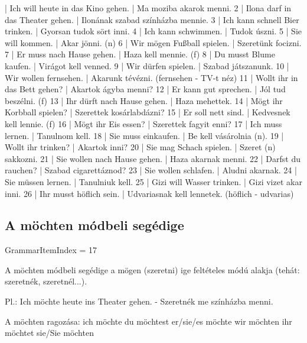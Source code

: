 \documentclass{article}
\newenvironment{desc}{\verbatim}{\endverbatim}
\newenvironment{exmp}{\verbatim}{\endverbatim}
\begin{document}
\begin{exmp}
1 | Ich will heute in das Kino gehen. | Ma moziba akarok menni.
2 | Ilona darf in das Theater gehen. | Ilonának szabad színházba mennie.
3 | Ich kann schnell Bier trinken. | Gyorsan tudok sört inni.
4 | Ich kann schwimmen. | Tudok úszni.
5 | Sie will kommen. | Akar jönni. (n)
6 | Wir mögen Fußball spielen. | Szeretünk focizni.
7 | Er muss nach Hause gehen. | Haza kell mennie. (f)
8 | Du musst Blume kaufen. | Virágot kell venned.
9 | Wir dürfen spielen. | Szabad játszanunk.
10 | Wir wollen fernsehen. | Akarunk tévézni. (fernsehen - TV-t néz)
11 | Wollt ihr in das Bett gehen? | Akartok ágyba menni?
12 | Er kann gut sprechen. | Jól tud beszélni. (f)
13 | Ihr dürft nach Hause gehen. | Haza mehettek.
14 | Mögt ihr Korbball spielen? | Szerettek kosárlabdázni?
15 | Er soll nett sind. | Kedvesnek kell lennie. (f)
16 | Mögt ihr Eis essen? | Szerettek fagyit enni?
17 | Ich muss lernen. | Tanulnom kell.
18 | Sie muss einkaufen. | Be kell vásárolnia (n).
19 | Wollt ihr trinken? | Akartok inni?
20 | Sie mag Schach spielen. | Szeret (n) sakkozni.
21 | Sie wollen nach Hause gehen. | Haza akarnak menni.
22 | Darfst du rauchen? | Szabad cigarettáznod?
23 | Sie wollen schlafen. | Aludni akarnak.
24 | Sie müssen lernen. | Tanulniuk kell.
25 | Gizi will Wasser trinken. | Gizi vizet akar inni.
26 | Ihr musst höflich sein. | Udvariasnak kell lennetek. (höflich - udvarias)
\end{exmp}

\subsection{A möchten módbeli segédige}

GrammarItemIndex = 17

\begin{desc}
A möchten módbeli segédige a mögen (szeretni) ige feltételes módú
alakja (tehát: szeretnék, szeretnél...).

Pl.: Ich möchte heute ins Theater gehen. - Szeretnék me színházba menni.

A möchten ragozása:
ich möchte 
du möchtest 
er/sie/es möchte 
wir möchten 
ihr möchtet 
sie/Sie möchten
\end{desc}
\end{document}
